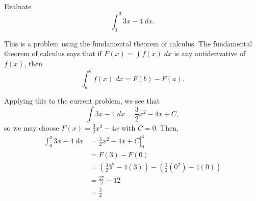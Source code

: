 \documentclass{ximera}
\author{Emma Smith Zbarsky}
\begin{document}
\begin{exercise}

Evaluate \[\int_{0}^3 3x-4\; dx.\]


\begin{hint}
This is a problem using the fundamental theorem of calculus. The
fundamental theorem of calculus says that if $F(x) = \int f(x)\; dx$ is
any antiderivative of $f(x)$, then \[\int_a^b f(x)\; dx = F(b)-F(a).\]
\end{hint}


\begin{hint}
Applying this to the current problem, we see that
\[\int 3x-4\; dx = \frac{3}{2}x^2 -4x +C, \] so we may choose
$F(x) = \frac{3}{2}x^2-4x$ with $C=0$. Then, \begin{align*}
\int_0^3 3x-4\; dx &= \left.\frac{3}{2}x^2-4x+C\right|_0^3 \\
&= F(3)-F(0) \\
&= \left(\frac{3}{2}3^2-4(3)\right)-\left(\frac{3}{2}(0^2)-4(0)\right) \\
&= \frac{27}{2}-12 \\
&= \frac{3}{2}
\end{align*}
\end{hint}


\begin{multipleChoice}
\end{multipleChoice}

\end{exercise}
\end{document}
